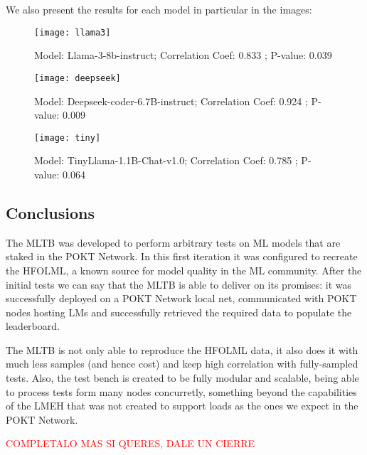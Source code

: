 We also present the results for each model in particular in the images:

\begin{figure}
    \centering
    \texttt{[image: llama3]}
    \caption{Model: Llama-3-8b-instruct; Correlation Coef: 0.833 ; P-value: 0.039}
    \label{secb:fig:m1}
\end{figure}

\begin{figure}
    \centering
    \texttt{[image: deepseek]}
    \caption{Model: Deepseek-coder-6.7B-instruct; Correlation Coef: 0.924 ; P-value: 0.009}
    \label{secb:fig:m2}
\end{figure}

\begin{figure}
    \centering
    \texttt{[image: tiny]}
    \caption{Model: TinyLlama-1.1B-Chat-v1.0; Correlation Coef: 0.785 ; P-value: 0.064}
    \label{secb:fig:m3}
\end{figure}



\subsection{Conclusions}

The \gls{MLTB} was developed to perform arbitrary tests on \gls{ML} models that are staked in the POKT Network. In this first iteration it was configured to recreate the \gls{HFOLML}, a known source for model quality in the \gls{ML} community. After the initial tests we can say that the \gls{MLTB} is able to deliver on its promises: it was successfully deployed on a POKT Network local net, communicated with POKT nodes hosting \glspl{LM} and successfully retrieved the required data to populate the leaderboard. 

The \gls{MLTB} is not only able to reproduce the \gls{HFOLML} data, it also does it with much less samples (and hence cost) and keep high correlation with fully-sampled tests. Also, the test bench is created to be fully modular and scalable, being able to process tests form many nodes concurretly, something beyond the capabilities of the \gls{LMEH} that was not created to support loads as the ones we expect in the POKT Network.

\textcolor{red}{COMPLETALO MAS SI QUERES, DALE UN CIERRE}